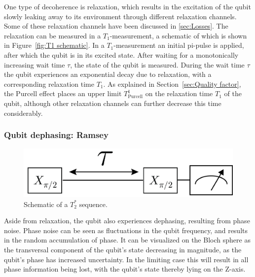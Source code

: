           One type of decoherence is relaxation, which results in the excitation of the qubit slowly leaking away to its environment through different relaxation channels. Some of these relaxation channels have been discussed in \ref{sec:Losses}. The relaxation can be measured in a $T_1$-measurement, a schematic of which is shown in Figure~\ref{fig:T1 schematic}. In a $T_1$-measurement an initial pi-pulse is applied, after which the qubit is in its excited state. After waiting for a monotonically increasing wait time $\tau$, the state of the qubit is measured. During the wait time $\tau$ the qubit experiences an exponential decay due to relaxation, with a corresponding relaxation time $T_1$. As explained in Section~\ref{sec:Quality factor}, the Purcell effect places an upper limit $T^1_\text{Purcell}$ on the relaxation time $T_1$ of the qubit, although other relaxation channels can further decrease this time considerably.

        \subsubsection{Qubit dephasing: Ramsey}
          \label{sssec:Ramsey}

          \begin{figure}
            \begin{center}
            \vspace{-30pt}
              \includegraphics[width=\textwidth]{../Figures/Qubit characterization/T2 decoherence.png}
            \end{center}
            \vspace{-20 pt}
            \caption{Schematic of a $T_2^*$ sequence.}
            \label{fig:T2star schematic}
          \end{figure}

          Aside from relaxation, the qubit also experiences dephasing, resulting from phase noise. Phase noise can be seen as fluctuations in the qubit frequency, and results in the random accumulation of phase. It can be visualized on the Bloch sphere as the transversal component of the qubit's state decreasing in magnitude, as the qubit's phase has increased uncertainty. In the limiting case this will result in all phase information being lost, with the qubit's state thereby lying on the Z-axis.

